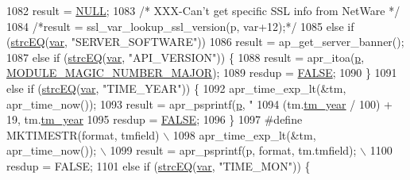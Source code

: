 \begin{DoxyCode}
{1082             result = \hyperlink{pcre_8txt_ad7f989d16aa8ca809a36bc392c07fba1}{NULL};
1083             \textcolor{comment}{/* XXX-Can't get specific SSL info from NetWare */}
1084             \textcolor{comment}{/*result = ssl\_var\_lookup\_ssl\_version(p, var+12);*/}
1085         \textcolor{keywordflow}{else} \textcolor{keywordflow}{if} (\hyperlink{mod__nw__ssl_8c_a8c9b1bea39b1e4f8b9ecad58e16b6e71}{strcEQ}(\hyperlink{group__MOD__PROXY_ga81bb7fed3eaa4dd24455759f1cb26176}{var}, \textcolor{stringliteral}{"SERVER\_SOFTWARE"}))
1086             result = ap\_get\_server\_banner();
1087         \textcolor{keywordflow}{else} \textcolor{keywordflow}{if} (\hyperlink{mod__nw__ssl_8c_a8c9b1bea39b1e4f8b9ecad58e16b6e71}{strcEQ}(\hyperlink{group__MOD__PROXY_ga81bb7fed3eaa4dd24455759f1cb26176}{var}, \textcolor{stringliteral}{"API\_VERSION"})) \{
1088             result = apr\_itoa(\hyperlink{group__APACHE__CORE__MPM_ga5cd91701e5c167f2b1a38e70ab57817e}{p}, \hyperlink{group__APACHE__CORE__MMN_ga317b5a0001d505331fafd3864636c2ad}{MODULE\_MAGIC\_NUMBER\_MAJOR});
1089             resdup = \hyperlink{group__MOD__SSL__PRIVATE_gaa93f0eb578d23995850d61f7d61c55c1}{FALSE};
1090         \}
1091         \textcolor{keywordflow}{else} \textcolor{keywordflow}{if} (\hyperlink{mod__nw__ssl_8c_a8c9b1bea39b1e4f8b9ecad58e16b6e71}{strcEQ}(\hyperlink{group__MOD__PROXY_ga81bb7fed3eaa4dd24455759f1cb26176}{var}, \textcolor{stringliteral}{"TIME\_YEAR"})) \{
1092             apr\_time\_exp\_lt(&tm, apr\_time\_now());
1093             result = apr\_psprintf(\hyperlink{group__APACHE__CORE__MPM_ga5cd91701e5c167f2b1a38e70ab57817e}{p}, \textcolor{stringliteral}{"%
1094                                  (tm.\hyperlink{structapr__time__exp__t_a35c32245be49279a6689e34bcd6e534a}{tm\_year} / 100) + 19, tm.\hyperlink{structapr__time__exp__t_a35c32245be49279a6689e34bcd6e534a}{tm\_year} %
1095             resdup = \hyperlink{group__MOD__SSL__PRIVATE_gaa93f0eb578d23995850d61f7d61c55c1}{FALSE};
1096         \}
1097 \textcolor{preprocessor}{#define MKTIMESTR(format, tmfield) \(\backslash\)}
1098 \textcolor{preprocessor}{            apr\_time\_exp\_lt(&tm, apr\_time\_now()); \(\backslash\)}
1099 \textcolor{preprocessor}{            result = apr\_psprintf(p, format, tm.tmfield); \(\backslash\)}
1100 \textcolor{preprocessor}{            resdup = FALSE;}
1101         \textcolor{keywordflow}{else} \textcolor{keywordflow}{if} (\hyperlink{mod__nw__ssl_8c_a8c9b1bea39b1e4f8b9ecad58e16b6e71}{strcEQ}(\hyperlink{group__MOD__PROXY_ga81bb7fed3eaa4dd24455759f1cb26176}{var}, \textcolor{stringliteral}{"TIME\_MON"})) \{
}}
\end{DoxyCode}
